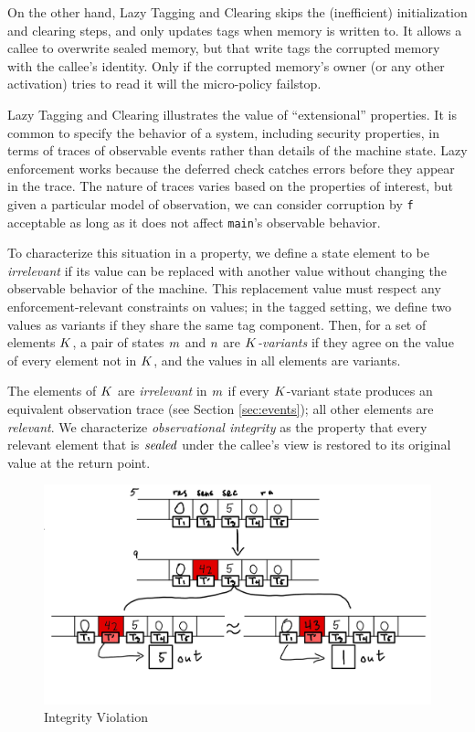 \documentclass[10pt,conference]{ieeetran}%
\theoremstyle{definition}
\begin{document}
On the other hand, Lazy Tagging and Clearing skips the (inefficient)
initialization and clearing steps, and only updates tags when memory is written to.
It allows a callee to overwrite sealed memory, but that write tags the corrupted memory
with the callee's identity. Only if the corrupted memory's owner (or any other activation) tries
to read it will the micro-policy failstop.

Lazy Tagging and Clearing illustrates the value of ``extensional'' properties.
It is common to specify the behavior of a system, including security properties, in
terms of traces of observable events rather than details of the machine state.
Lazy enforcement works because the deferred check catches errors before they appear
in the trace. The nature of traces varies based on the properties of interest, but
given a particular model of observation, we can consider
corruption by {\tt f} acceptable as long as it does not affect {\tt main}'s observable behavior.

To characterize this situation in a property, we define a state element to be \emph{irrelevant}
if its value can be replaced with another value without changing the observable behavior
of the machine. This replacement value must respect any enforcement-relevant constraints on
values; in the tagged setting, we define two values as variants if they share the same tag
component. Then, for a set of elements \(K\),
a pair of states \(m\) and \(n\) are {\em \(K\)-variants} if
they agree on the value of every element not in \(K\), and the values
in all elements are variants.

The elements of \(K\) are \emph{irrelevant}
in \(m\) if every \(K\)-variant state produces an equivalent observation trace
(see Section \ref{sec:events}); all other elements are \emph{relevant}.
We characterize \emph{observational integrity} as the property that
every relevant element that is \(\mathit{sealed}\) under the callee's view is restored
to its original value at the return point.

\begin{figure}
  \includegraphics[width=\columnwidth]{variants.png}
  \caption{Integrity Violation}
  \label{fig:variant}
\end{figure}
\end{document}

